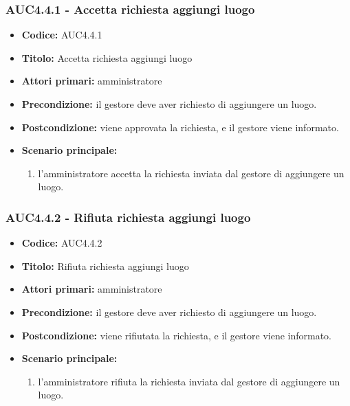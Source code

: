 \documentclass[casi-duso]{subfiles}
\begin{document}
\subsubsection{AUC4.4.1 - Accetta richiesta aggiungi luogo}%
\label{subsub:AUC4.4.1}
\begin{itemize}
  \item \textbf{Codice:} AUC4.4.1
  \item \textbf{Titolo:} Accetta richiesta aggiungi luogo
  \item \textbf{Attori primari:} amministratore
  \item \textbf{Precondizione:} il gestore deve aver richiesto di aggiungere un luogo.
  \item \textbf{Postcondizione:} viene approvata la richiesta, e il gestore viene informato.
  \item \textbf{Scenario principale:}
  \begin{enumerate}
    \item  l'amministratore accetta la richiesta inviata dal gestore di aggiungere un luogo.
  \end{enumerate}
\end{itemize}

\subsubsection{AUC4.4.2 - Rifiuta richiesta aggiungi luogo}%
\label{subsub:AUC4.4.2}
\begin{itemize}
  \item \textbf{Codice:} AUC4.4.2
  \item \textbf{Titolo:} Rifiuta richiesta aggiungi luogo
  \item \textbf{Attori primari:} amministratore
  \item \textbf{Precondizione:} il gestore deve aver richiesto di aggiungere un luogo.
  \item \textbf{Postcondizione:} viene rifiutata la richiesta, e il gestore viene informato.
  \item \textbf{Scenario principale:}
  \begin{enumerate}
    \item l'amministratore rifiuta la richiesta inviata dal gestore di aggiungere un luogo.
  \end{enumerate}
\end{itemize}
\end{document}
